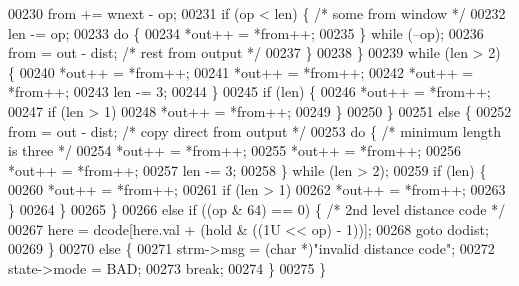 \begin{DoxyCode}
{{{{{00230                         from += wnext - op;
00231                         \textcolor{keywordflow}{if} (op < len) \{         \textcolor{comment}{/* some from window */}
00232                             len -= op;
00233                             \textcolor{keywordflow}{do} \{
00234                                 *out++ = *from++;
00235                             \} \textcolor{keywordflow}{while} (--op);
00236                             from = out - dist;  \textcolor{comment}{/* rest from output */}
00237                         \}
00238                     \}
00239                     \textcolor{keywordflow}{while} (len > 2) \{
00240                         *out++ = *from++;
00241                         *out++ = *from++;
00242                         *out++ = *from++;
00243                         len -= 3;
00244                     \}
00245                     \textcolor{keywordflow}{if} (len) \{
00246                         *out++ = *from++;
00247                         \textcolor{keywordflow}{if} (len > 1)
00248                             *out++ = *from++;
00249                     \}
00250                 \}
00251                 \textcolor{keywordflow}{else} \{
00252                     from = out - dist;          \textcolor{comment}{/* copy direct from output */}
00253                     \textcolor{keywordflow}{do} \{                        \textcolor{comment}{/* minimum length is three */}
00254                         *out++ = *from++;
00255                         *out++ = *from++;
00256                         *out++ = *from++;
00257                         len -= 3;
00258                     \} \textcolor{keywordflow}{while} (len > 2);
00259                     \textcolor{keywordflow}{if} (len) \{
00260                         *out++ = *from++;
00261                         \textcolor{keywordflow}{if} (len > 1)
00262                             *out++ = *from++;
00263                     \}
00264                 \}
00265             \}
00266             \textcolor{keywordflow}{else} \textcolor{keywordflow}{if} ((op & 64) == 0) \{          \textcolor{comment}{/* 2nd level distance code */}
00267                 here = dcode[here.val + (hold & ((1U << op) - 1))];
00268                 \textcolor{keywordflow}{goto} dodist;
00269             \}
00270             \textcolor{keywordflow}{else} \{
00271                 strm->msg = (\textcolor{keywordtype}{char} *)\textcolor{stringliteral}{"invalid distance code"};
00272                 state->mode = BAD;
00273                 \textcolor{keywordflow}{break};
00274             \}
00275         \}
}}}}}
\end{DoxyCode}
